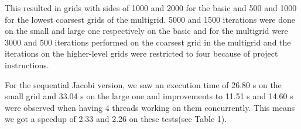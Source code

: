 \documentclass{article}
\begin{document}
\begin{table}
\centering
{}
\caption{Sequential Jacobi test results}
    \label{fig:jacobi}
\end{table}

This resulted in grids with sides of 1000 and 2000 for the basic and 500 and 1000 for the lowest coarsest grids of the multigrid. 5000 and 1500 iterations were done on the small and large one respectively on the basic and for the multigrid were 3000 and 500 iterations performed on the coarsest grid in the multigrid and the iterations on the higher-level grids were restricted to four because of project instructions.


For the sequential Jacobi version, we saw an execution time of 26.80 s on the small grid and 33.04 s on the large one and improvements to 11.51 s and 14.60 s were observed when having 4 threads working on them concurrently. This means we got a speedup of 2.33 and 2.26 on these tests(see Table 1).
\end{document}

